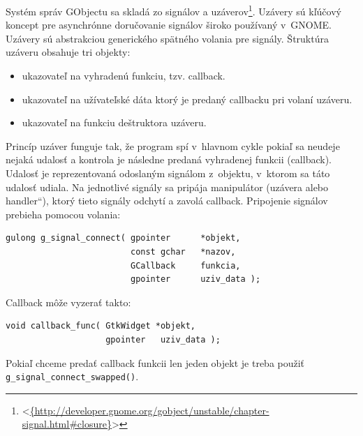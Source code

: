 \documentclass[12pt,oneside,final]{fithesis2}
\newcommand\uv[1]{\quotedblbase #1\textquotedblleft}
\begin{document}
Systém správ GObjectu sa skladá zo signálov a uzáverov\footnote{<\url{{http://developer.gnome.org/gobject/unstable/chapter-signal.html\#closure}}>}. Uzávery sú kľúčový koncept pre asynchrónne doručovanie signálov široko používaný v~GNOME. Uzávery sú abstrakciou generického spätného volania pre signály. Štruktúra uzáveru obsahuje tri objekty:
\begin{itemize}
\item ukazovateľ na vyhradenú funkciu, tzv. callback.
\item ukazovateľ na užívateľské dáta ktorý je predaný callbacku pri volaní uzáveru.
\item ukazovateľ na funkciu deštruktora uzáveru.
\end{itemize}
Princíp uzáver funguje tak, že program spí v~hlavnom cykle pokiaľ sa neudeje nejaká udalosť a kontrola je následne predaná vyhradenej funkcii (callback). Udalosť je reprezentovaná odoslaným signálom z~objektu, v~ktorom sa táto udalosť udiala. Na jednotlivé signály sa pripája manipulátor (uzávera alebo \uv{handler}), ktorý tieto signály odchytí a zavolá callback. Pripojenie signálov prebieha pomocou volania:
\begin{verbatim}
gulong g_signal_connect( gpointer      *objekt,
                         const gchar   *nazov,
                         GCallback     funkcia,
                         gpointer      uziv_data );
\end{verbatim} Callback môže vyzerať takto: 
\begin{verbatim}
void callback_func( GtkWidget *objekt,
                    gpointer   uziv_data );
\end{verbatim}
Pokiaľ chceme predať callback funkcii len jeden objekt je treba použiť \texttt{g\_\-signal\_\-connect\_\-swapped()}.
\end{document}
